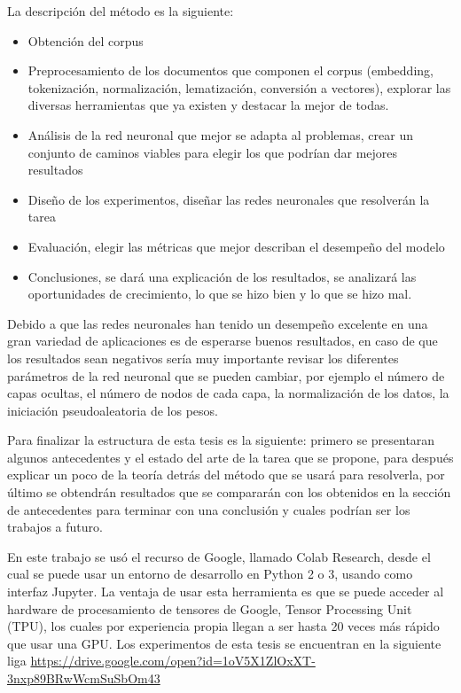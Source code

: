 \par La descripción del método es la siguiente:
\begin{itemize}
	\item Obtención del corpus
	\item Preprocesamiento de los documentos que componen el corpus (embedding, tokenización, normalización, lematización, conversión a vectores), explorar las diversas herramientas que ya existen y destacar la mejor de todas.
	\item Análisis de la red neuronal que mejor se adapta al problemas, crear un conjunto de caminos viables para elegir los que podrían dar mejores resultados
	\item Diseño de los experimentos, diseñar las redes neuronales que resolverán la tarea
	\item Evaluación, elegir las métricas que mejor describan el desempeño del modelo
	\item Conclusiones, se dará una explicación de los resultados, se analizará las oportunidades de crecimiento, lo que se hizo bien y lo que se hizo mal.
\end{itemize}

\par Debido a que las redes neuronales han tenido un desempeño excelente en una gran variedad de aplicaciones es de esperarse buenos resultados, en caso de que los resultados sean negativos sería muy importante revisar los diferentes parámetros de la red neuronal que se pueden cambiar, por ejemplo el número de capas ocultas, el número de nodos de cada capa, la normalización de los datos, la iniciación pseudoaleatoria de los pesos.

\par Para finalizar la estructura de esta tesis es la siguiente: primero se presentaran algunos antecedentes y el estado del arte de la tarea que se propone, para después explicar un poco de la teoría detrás del método que se usará para resolverla, por último se obtendrán resultados que se compararán con los obtenidos en la sección de antecedentes para terminar con una conclusión y cuales podrían ser los trabajos a futuro.

\par En este trabajo se usó el recurso de Google, llamado Colab Research, desde el cual se puede usar un entorno de desarrollo en Python 2 o 3, usando como interfaz Jupyter. La ventaja de usar esta herramienta es que se puede acceder al hardware de procesamiento de tensores de Google, Tensor Processing Unit (TPU), los cuales por experiencia propia llegan a ser hasta 20 veces más rápido que usar una GPU. Los experimentos de esta tesis se encuentran en la siguiente liga \href{ https://drive.google.com/open?id=1oV5X1ZlOxXT-3nxp89BRwWcmSuSbOm43}{https://drive.google.com/open?id=1oV5X1ZlOxXT-3nxp89BRwWcmSuSbOm43}